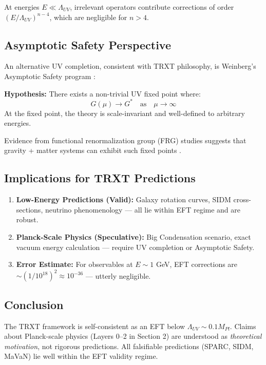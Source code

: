 At energies $E \ll \Lambda_{UV}$, irrelevant operators contribute corrections of order $(E/\Lambda_{UV})^{n-4}$, which are negligible for $n > 4$.

\subsection{Asymptotic Safety Perspective}

An alternative UV completion, consistent with TRXT philosophy, is Weinberg's Asymptotic Safety program \cite{weinberg_as}:

\textbf{Hypothesis:} There exists a non-trivial UV fixed point where:
\begin{equation}
    G(\mu) \to G^* \quad \text{as} \quad \mu \to \infty
\end{equation}
At the fixed point, the theory is scale-invariant and well-defined to arbitrary energies.

Evidence from functional renormalization group (FRG) studies suggests that gravity + matter systems can exhibit such fixed points \cite{reuter}.

\subsection{Implications for TRXT Predictions}

\begin{enumerate}
    \item \textbf{Low-Energy Predictions (Valid):} Galaxy rotation curves, SIDM cross-sections, neutrino phenomenology — all lie within EFT regime and are robust.
    \item \textbf{Planck-Scale Physics (Speculative):} Big Condensation scenario, exact vacuum energy calculation — require UV completion or Asymptotic Safety.
    \item \textbf{Error Estimate:} For observables at $E \sim 1$ GeV, EFT corrections are $\sim (1/10^{18})^2 \approx 10^{-36}$ — utterly negligible.
\end{enumerate}

\subsection{Conclusion}

The TRXT framework is self-consistent as an EFT below $\Lambda_{UV} \sim 0.1 M_{Pl}$. Claims about Planck-scale physics (Layers 0–2 in Section 2) are understood as \textit{theoretical motivation}, not rigorous predictions. All falsifiable predictions (SPARC, SIDM, MaVaN) lie well within the EFT validity regime.
